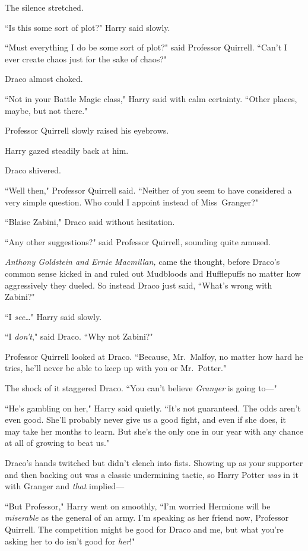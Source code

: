 The silence stretched.

``Is this some sort of plot?" Harry said slowly.

``Must everything I do be some sort of plot?" said Professor Quirrell. ``Can't I ever create chaos just for the sake of chaos?"

Draco almost choked.

``Not in your Battle Magic class," Harry said with calm certainty. ``Other places, maybe, but not there."

Professor Quirrell slowly raised his eyebrows.

Harry gazed steadily back at him.

Draco shivered.

``Well then," Professor Quirrell said. ``Neither of you seem to have considered a very simple question. Who could I appoint instead of Miss~Granger?"

``Blaise Zabini," Draco said without hesitation.

``Any other suggestions?" said Professor Quirrell, sounding quite amused.

\emph{Anthony Goldstein and Ernie Macmillan,} came the thought, before Draco's common sense kicked in and ruled out Mudbloods and Hufflepuffs no matter how aggressively they dueled. So instead Draco just said, ``What's wrong with Zabini?"

``I \emph{see}{\ldots}" Harry said slowly.

``I \emph{don't}," said Draco. ``Why not Zabini?"

Professor Quirrell looked at Draco. ``Because, Mr.~Malfoy, no matter how hard he tries, he'll never be able to keep up with you or Mr.~Potter."

The shock of it staggered Draco. ``You can't believe \emph{Granger} is going to---"

``He's gambling on her," Harry said quietly. ``It's not guaranteed. The odds aren't even good. She'll probably never give us a good fight, and even if she does, it may take her months to learn. But she's the only one in our year with any chance at all of growing to beat us."

Draco's hands twitched but didn't clench into fists. Showing up as your supporter and then backing out was a classic undermining tactic, so Harry Potter \emph{was} in it with Granger and \emph{that} implied---

``But Professor," Harry went on smoothly, ``I'm worried Hermione will be \emph{miserable} as the general of an army. I'm speaking as her friend now, Professor Quirrell. The competition might be good for Draco and me, but what you're asking her to do isn't good for \emph{her}!"

